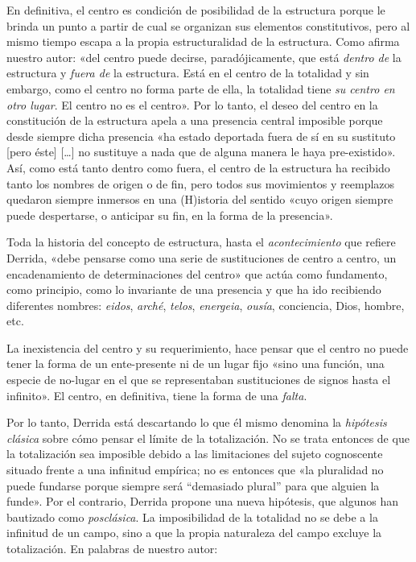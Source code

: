 En definitiva, el centro es condición de posibilidad de la estructura porque le brinda un punto a partir de cual se organizan sus elementos constitutivos, pero al mismo tiempo escapa a la propia estructuralidad de la estructura. Como afirma nuestro autor: «del centro puede decirse, paradójicamente, que está \emph{dentro de} la estructura y \emph{fuera de} la estructura. Está en el centro de la totalidad y sin embargo, como el centro no forma parte de ella, la totalidad tiene \emph{su centro en otro lugar}. El centro no es el centro». Por lo tanto, el deseo del centro en la constitución de la estructura apela a una presencia central imposible porque desde siempre dicha presencia «ha estado deportada fuera de sí en su sustituto {[}pero éste{]} {[}\ldots{]} no sustituye a nada que de alguna manera le haya pre-existido». Así, como está tanto dentro como fuera, el centro de la estructura ha recibido tanto los nombres de origen o de fin, pero todos sus movimientos y reemplazos quedaron siempre inmersos en una (H)istoria del sentido «cuyo origen siempre puede despertarse, o anticipar su fin, en la forma de la presencia».

Toda la historia del concepto de estructura, hasta el \emph{acontecimiento} que refiere Derrida, «debe pensarse como una serie de sustituciones de centro a centro, un encadenamiento de determinaciones del centro» que actúa como fundamento, como principio, como lo invariante de una presencia y que ha ido recibiendo diferentes nombres: \emph{eidos}, \emph{arché}, \emph{telos}, \emph{energeia}, \emph{ousía}, conciencia, Dios, hombre, etc.

La inexistencia del centro y su requerimiento, hace pensar que el centro no puede tener la forma de un ente-presente ni de un lugar fijo «sino una función, una especie de no-lugar en el que se representaban sustituciones de signos hasta el infinito». El centro, en definitiva, tiene la forma de una \emph{falta}.

Por lo tanto, Derrida está descartando lo que él mismo denomina la \emph{hipótesis clásica} sobre cómo pensar el límite de la totalización. No se trata entonces de que la totalización sea imposible debido a las limitaciones del sujeto cognoscente situado frente a una infinitud empírica; no es entonces que «la pluralidad no puede fundarse porque siempre será ``demasiado plural'' para que alguien la funde». Por el contrario, Derrida propone una nueva hipótesis, que algunos han bautizado como \emph{posclásica}. La imposibilidad de la totalidad no se debe a la infinitud de un campo, sino a que la propia naturaleza del campo excluye la totalización. En palabras de nuestro autor:

